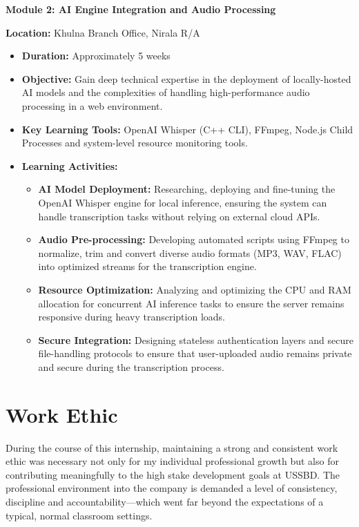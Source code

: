 \documentclass[oneside]{thesis-library}
\begin{document}
{\large\textbf{Module 2: AI Engine Integration and Audio Processing}}

\textbf{Location:} Khulna Branch Office, Nirala R/A
\begin{itemize}
    \item \textbf{Duration:} Approximately 5 weeks
    \item \textbf{Objective:} Gain deep technical expertise in the deployment of locally-hosted AI models and the complexities of handling high-performance audio processing in a web environment.
    \item \textbf{Key Learning Tools:} OpenAI Whisper (C++ CLI), FFmpeg, Node.js Child Processes and system-level resource monitoring tools.
    \item \textbf{Learning Activities:}
    \begin{itemize}
        \item \textbf{AI Model Deployment:} Researching, deploying and fine-tuning the OpenAI Whisper engine for local inference, ensuring the system can handle transcription tasks without relying on external cloud APIs.
        \item \textbf{Audio Pre-processing:} Developing automated scripts using FFmpeg to normalize, trim and convert diverse audio formats (MP3, WAV, FLAC) into optimized streams for the transcription engine.
        \item \textbf{Resource Optimization:} Analyzing and optimizing the CPU and RAM allocation for concurrent AI inference tasks to ensure the server remains responsive during heavy transcription loads.
        \item \textbf{Secure Integration:} Designing stateless authentication layers and secure file-handling protocols to ensure that user-uploaded audio remains private and secure during the transcription process.
    \end{itemize}
\end{itemize}

\section{Work Ethic}
During the course of this internship, maintaining a strong and consistent work ethic was necessary not only for my individual professional growth but also for contributing meaningfully to the high stake development goals at USSBD. The professional environment into the company is demanded a level of consistency, discipline and accountability---which went far beyond the expectations of a typical, normal classroom settings.
\end{document}
